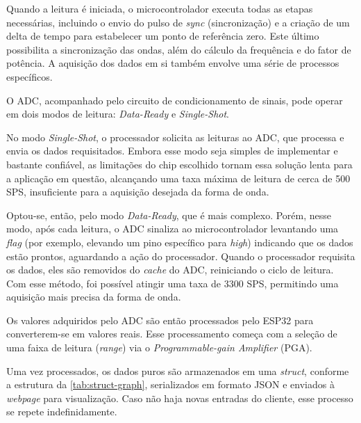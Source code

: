 Quando a leitura é iniciada, o microcontrolador executa todas as etapas necessárias, incluindo o envio do pulso de \textit{sync} (sincronização) e a criação de um delta de tempo para estabelecer um ponto de referência zero. Este último possibilita a sincronização das ondas, além do cálculo da frequência e do fator de potência. A aquisição dos dados em si também envolve uma série de processos específicos.

O \gls{ADC}, acompanhado pelo circuito de condicionamento de sinais, pode operar em dois modos de leitura: \textit{Data-Ready} e \textit{Single-Shot}.

No modo \textit{Single-Shot}, o processador solicita as leituras ao \gls{ADC}, que processa e envia os dados requisitados. Embora esse modo seja simples de implementar e bastante confiável, as limitações do chip escolhido tornam essa solução lenta para a aplicação em questão, alcançando uma taxa máxima de leitura de cerca de 500 \gls{SPS}, insuficiente para a aquisição desejada da forma de onda.

Optou-se, então, pelo modo \textit{Data-Ready}, que é mais complexo. Porém, nesse modo, após cada leitura, o \gls{ADC} sinaliza ao microcontrolador levantando uma \textit{flag} (por exemplo, elevando um pino específico para \textit{high}) indicando que os dados estão prontos, aguardando a ação do processador. Quando o processador requisita os dados, eles são removidos do \textit{cache} do \gls{ADC}, reiniciando o ciclo de leitura. Com esse método, foi possível atingir uma taxa de 3300 \gls{SPS}, permitindo uma aquisição mais precisa da forma de onda.

Os valores adquiridos pelo \gls{ADC} são então processados pelo ESP32 para converterem-se em valores reais. Esse processamento começa com a seleção de uma faixa de leitura (\textit{range}) via o \textit{Programmable-gain Amplifier} (\gls{PGA}).

Uma vez processados, os dados puros são armazenados em uma \textit{struct}, conforme a estrutura da \autoref{tab:struct-graph}, serializados em formato JSON e enviados à \textit{webpage} para visualização. Caso não haja novas entradas do cliente, esse processo se repete indefinidamente.

